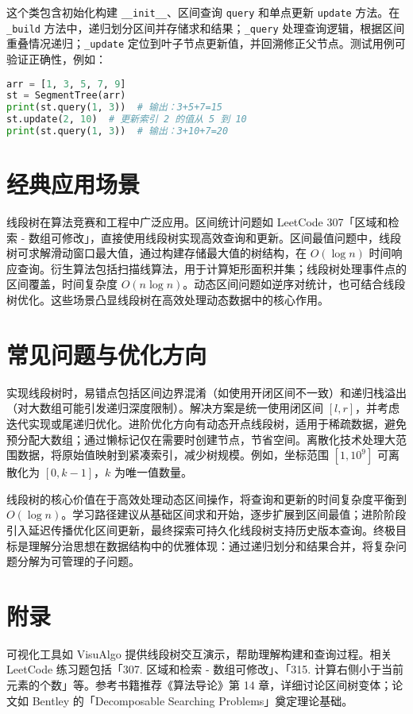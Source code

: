 这个类包含初始化构建 \texttt{\_{}\_{}init\_{}\_{}}、区间查询 \texttt{query} 和单点更新 \texttt{update} 方法。在 \texttt{\_{}build} 方法中，递归划分区间并存储求和结果；\texttt{\_{}query} 处理查询逻辑，根据区间重叠情况递归；\texttt{\_{}update} 定位到叶子节点更新值，并回溯修正父节点。测试用例可验证正确性，例如：\par
\begin{lstlisting}[language=python]
arr = [1, 3, 5, 7, 9]
st = SegmentTree(arr)
print(st.query(1, 3))  # 输出：3+5+7=15
st.update(2, 10)  # 更新索引 2 的值从 5 到 10
print(st.query(1, 3))  # 输出：3+10+7=20
\end{lstlisting}
\chapter{经典应用场景}
线段树在算法竞赛和工程中广泛应用。区间统计问题如 LeetCode 307「区域和检索 - 数组可修改」，直接使用线段树实现高效查询和更新。区间最值问题中，线段树可求解滑动窗口最大值，通过构建存储最大值的树结构，在 $O(\log n)$ 时间响应查询。衍生算法包括扫描线算法，用于计算矩形面积并集；线段树处理事件点的区间覆盖，时间复杂度 $O(n \log n)$。动态区间问题如逆序对统计，也可结合线段树优化。这些场景凸显线段树在高效处理动态数据中的核心作用。\par
\chapter{常见问题与优化方向}
实现线段树时，易错点包括区间边界混淆（如使用开闭区间不一致）和递归栈溢出（对大数组可能引发递归深度限制）。解决方案是统一使用闭区间 $[l, r]$，并考虑迭代实现或尾递归优化。进阶优化方向有动态开点线段树，适用于稀疏数据，避免预分配大数组；通过懒标记仅在需要时创建节点，节省空间。离散化技术处理大范围数据，将原始值映射到紧凑索引，减少树规模。例如，坐标范围 $[1, 10^9]$ 可离散化为 $[0, k-1]$，$k$ 为唯一值数量。\par
线段树的核心价值在于高效处理动态区间操作，将查询和更新的时间复杂度平衡到 $O(\log n)$。学习路径建议从基础区间求和开始，逐步扩展到区间最值；进阶阶段引入延迟传播优化区间更新，最终探索可持久化线段树支持历史版本查询。终极目标是理解分治思想在数据结构中的优雅体现：通过递归划分和结果合并，将复杂问题分解为可管理的子问题。\par
\chapter{附录}
可视化工具如 VisuAlgo 提供线段树交互演示，帮助理解构建和查询过程。相关 LeetCode 练习题包括「307. 区域和检索 - 数组可修改」、「315. 计算右侧小于当前元素的个数」等。参考书籍推荐《算法导论》第 14 章，详细讨论区间树变体；论文如 Bentley 的「Decomposable Searching Problems」奠定理论基础。\par

